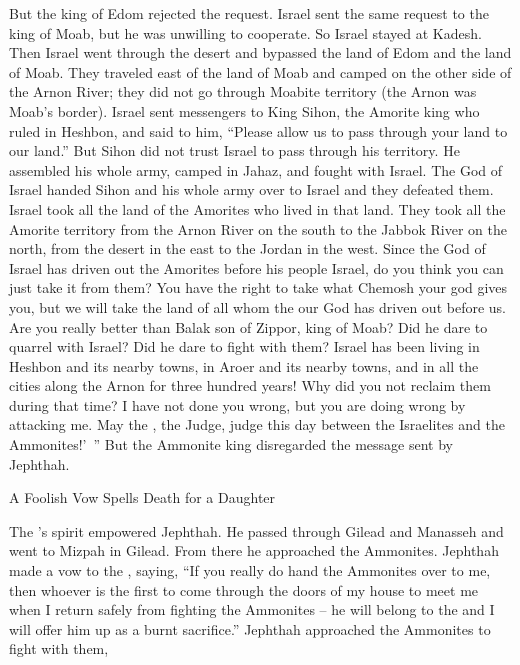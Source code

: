 {But
the king
of Edom
rejected the request.
Israel sent
the same
request to
the king
of Moab,
but he was unwilling
to cooperate. So Israel
stayed
at Kadesh.
Then Israel went through
the desert
and bypassed
the land
of Edom
and the land
of Moab.
They traveled
east
of the land
of Moab
and camped
on the other side
of the Arnon
River; they did not
go
through Moabite
territory
(the Arnon
was Moab’s
border).
Israel
sent
messengers
to
King
Sihon,
the Amorite
king
who ruled in Heshbon,
and said
to him, “Please
allow us to pass
through your land
to our land.”
But Sihon
did not
trust
Israel
to pass through
his territory.
He
assembled
his whole
army,
camped
in Jahaz,
and fought
with
Israel.
The
{}
God
of Israel
handed Sihon
and his whole
army
over
to Israel
and they defeated
them.
Israel
took
all
the land
of the Amorites
who lived
in that land.
They took
all
the Amorite
territory
from the Arnon
River
on the south to the Jabbok
River on the north, from
the desert
in the east to
the Jordan in the west.
Since
the {}
God
of Israel
has driven
out the Amorites
before
his people
Israel,
do you
think you can just take it from them?
You have
the right to take
what Chemosh
your god
gives you, but we will take
the land of all
whom
the {}
our God
has driven
out before us.
Are you really
better
than
Balak
son
of Zippor,
king
of Moab? Did he dare to quarrel
with
Israel? Did he dare to fight with them?
Israel
has been
living
in Heshbon
and its nearby towns,
in Aroer
and its nearby towns,
and in all
the cities
along
the Arnon
for three
hundred
years! Why
did you not
reclaim them
during that time?
I
have not
done you wrong,
but you
are doing
wrong
by attacking
me. May
the {}, the Judge,
judge
this day
between
the Israelites
and the Ammonites!’ ”
But the Ammonite
king
disregarded
the message
sent
by Jephthah.
\par }{\SH A Foolish Vow Spells Death for a Daughter
\par }{\PP {}The
{}’s
spirit
empowered
Jephthah.
He passed through
Gilead
and Manasseh
and went
to Mizpah
in Gilead.
From there he approached
the Ammonites.
Jephthah
made
a vow
to the
{}, saying,
“If
you really do hand
the Ammonites
over to me,
then
whoever is the first to come through
the doors
of my house
to meet
me when I return
safely
from fighting the Ammonites
– he will belong
to the
{}
and I will offer him up
as a burnt sacrifice.”
Jephthah
approached
the Ammonites
to fight
with them,
}
